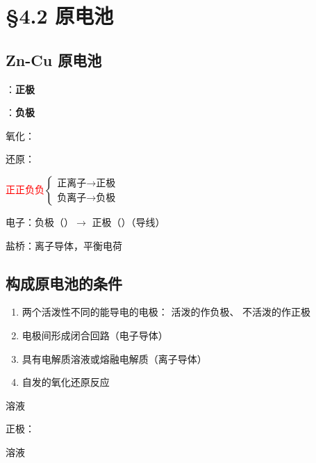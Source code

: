 \section{\S 4.2 原电池}\label{sect:原电池}

    \subsection{Zn-Cu 原电池}\label{subsec:ZnCu原电池}

        \begin{center}
        
        \end{center}

        ：\textbf{正极}

        ：\textbf{负极}

        氧化：

        还原：

        \textcolor{red}{正正负负}\(\left\{\begin{matrix}
            \text{正离子} \to \text{正极}\\
            \text{负离子} \to \text{负极}
        \end{matrix}\right.\)

        电子：负极（）\(\to\) 正极（）（导线）

        盐桥：离子导体，平衡电荷

    \subsection{构成原电池的条件}\label{subsec:构成原电池条件}

        \begin{enumerate}
            \item 两个活泼性不同的能导电的电极： 活泼的作负极、 不活泼的作正极
            \item 电极间形成闭合回路（电子导体）
            \item 具有电解质溶液或熔融电解质（离子导体）
            \item 自发的氧化还原反应
        \end{enumerate}

         溶液 \cmark

        正极：

         溶液 \cmark

